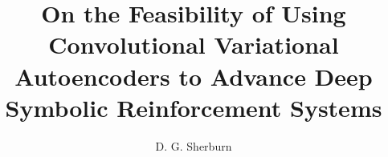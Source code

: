 \documentclass[a4paper,12pt,twoside]{report}
\begin{document}
\title{\LARGE {\bf On the Feasibility of Using Convolutional Variational Autoencoders to Advance Deep Symbolic Reinforcement Systems}\\
 \vspace*{6mm}
}

\author{D. G. Sherburn}

\normallinespacing
\maketitle

\preface




\body






\appendix




\end{document}
